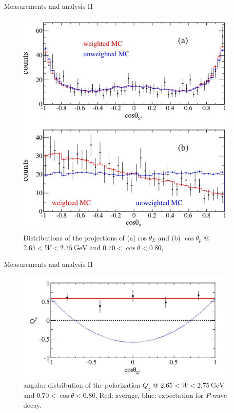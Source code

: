 \documentclass[11pt,aspectratio=1610,dvipsnames]{beamer}
\begin{document}
\begin{frame}{Measurements and analysis II}
		\begin{figure}
			\centering
			\includegraphics[width=.5\linewidth]{angular_dist}
			\caption*{Distributions of the projections of (a)$\cos\theta_\Sigma$ and (b) $\cos\theta_p$ @ $2.65<W<\SI{2.75}{\giga\eV}$ and $0.70<\cos\theta<0.80$,  \citet{spinparity}}
		\end{figure}

\end{frame}
\begin{frame}{Measurements and analysis II}
	\begin{figure}
		\centering
		\includegraphics[width=\linewidth]{angular_pol}
		\caption*{angular distribution of the polarization $Q_z$ @ $2.65<W<\SI{2.75}{\giga\eV}$ and $0.70<\cos\theta<0.80$. Red: average, blue: expectation for $P$-wave decay.  \citet{spinparity}}
	\end{figure}
	
\end{frame}
\end{document}
